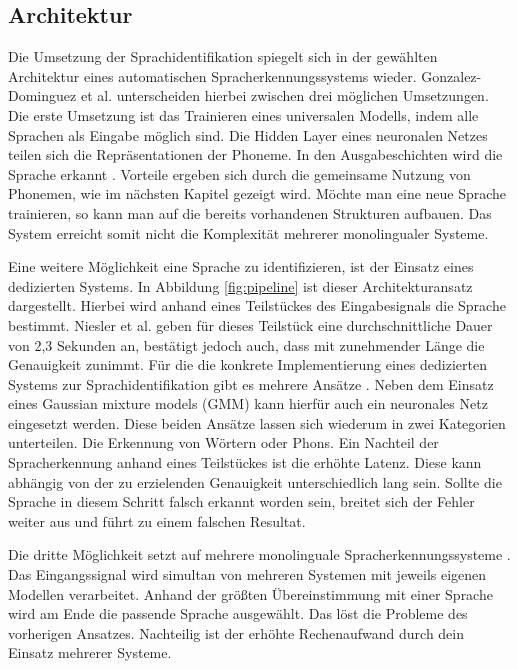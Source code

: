 \subsection{Architektur}
Die Umsetzung der Sprachidentifikation spiegelt sich in der gewählten Architektur eines automatischen Spracherkennungssystems wieder. Gonzalez-Dominguez et al. \cite{Gonzalez.2015} unterscheiden hierbei zwischen drei möglichen Umsetzungen.
Die erste Umsetzung ist das Trainieren eines universalen Modells, indem alle Sprachen als Eingabe möglich sind. Die Hidden Layer eines neuronalen Netzes teilen sich die Repräsentationen der Phoneme. In den Ausgabeschichten wird die Sprache erkannt \cite{Yu.2014}. 
Vorteile ergeben sich durch die gemeinsame Nutzung von Phonemen, wie im nächsten Kapitel gezeigt wird. Möchte man eine neue Sprache trainieren, so kann man auf die bereits vorhandenen Strukturen aufbauen.
Das System erreicht somit nicht die Komplexität mehrerer monolingualer Systeme\cite{Bartz.2017}.

Eine weitere Möglichkeit eine Sprache zu identifizieren, ist der Einsatz eines dedizierten Systems. In Abbildung \ref{fig:pipeline} ist dieser Architekturansatz dargestellt. Hierbei wird anhand eines Teilstückes des Eingabesignals die Sprache bestimmt. Niesler et al. \cite{Niesler.2006} geben für dieses Teilstück eine durchschnittliche Dauer von 2,3 Sekunden an, bestätigt jedoch auch, dass mit zunehmender Länge die Genauigkeit zunimmt. Für die die konkrete Implementierung eines dedizierten Systems zur Sprachidentifikation gibt es mehrere Ansätze \cite{Niesler.2006}. Neben dem Einsatz eines Gaussian mixture models (GMM) kann hierfür auch ein neuronales Netz eingesetzt werden.
Diese beiden Ansätze lassen sich wiederum in zwei Kategorien unterteilen. Die Erkennung von Wörtern oder Phons.
Ein Nachteil der Spracherkennung anhand eines Teilstückes ist die erhöhte Latenz. Diese kann abhängig von der zu erzielenden Genauigkeit unterschiedlich lang sein. Sollte die Sprache in diesem Schritt falsch erkannt worden sein,
breitet sich der Fehler weiter aus und führt zu einem falschen Resultat.

Die dritte Möglichkeit setzt auf mehrere monolinguale Spracherkennungssysteme \cite{Gonzalez.2015}.
Das Eingangssignal wird simultan von mehreren Systemen mit jeweils eigenen Modellen verarbeitet.
Anhand der größten Übereinstimmung mit einer Sprache wird am Ende die passende Sprache ausgewählt.
Das löst die Probleme des vorherigen Ansatzes. Nachteilig ist der erhöhte Rechenaufwand durch dein Einsatz mehrerer Systeme. 